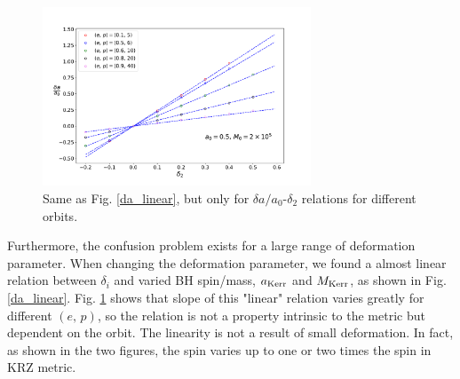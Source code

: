 \documentclass{article}
\begin{document}
\begin{figure}[!ht]
	\centering
	\includegraphics[width=8cm]{d2_deltaspin_ep.pdf}
	
	\caption{Same as Fig. \ref{da_linear}, but only for $\delta a/a_0$-$\delta_2$ relations for different orbits.}
	\label{ep_slope}
\end{figure}

Furthermore, the confusion problem exists for a large range of deformation parameter. When changing the deformation parameter, we found a almost linear relation between $\delta_i$ and varied BH spin/mass, $a_{\rm{Kerr}}$ and $M_{\rm{Kerr}}$, as shown in Fig. \ref{da_linear}. Fig. \ref{ep_slope} shows that slope of this "linear" relation varies greatly for different $(e,\,p)$, so the relation is not a property intrinsic to the metric but dependent on the orbit. The linearity is not a result of small deformation. In fact, as shown in the two figures, the spin varies up to one or two times the spin in KRZ metric. 
\end{document}

